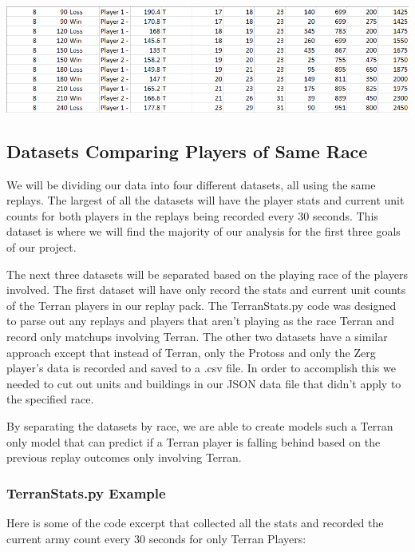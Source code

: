 \documentclass[a4paper,12pt]{report}
\begin{document}
\begin{center}
    \captionsetup{type=figure}
    \includegraphics[width=.9\linewidth]{media/CurrentCSV.png}
\end{center}

\subsection{Datasets Comparing Players of Same Race}

We will be dividing our data into four different datasets, all using the same replays. The largest of all the datasets will have the player stats and current unit counts for both players in the replays being recorded every 30 seconds. This dataset is where we will find the majority of our analysis for the first three goals of our project.

The next three datasets will be separated based on the playing race of the players involved. The first dataset will have only record the stats and current unit counts of the Terran players in our replay pack. The TerranStats.py code was designed to parse out any replays and players that aren’t playing as the race Terran and record only matchups involving Terran. The other two datasets have a similar approach except that instead of Terran, only the Protoss and only the Zerg player’s data is recorded and saved to a .csv file. In order to accomplish this we needed to cut out units and buildings in our JSON data file that didn’t apply to the specified race.

By separating the datasets by race, we are able to create models such a Terran only model that can predict if a Terran player is falling behind based on the previous replay outcomes only involving Terran. 

\subsubsection{TerranStats.py Example}
Here is some of the code excerpt that collected all the stats and recorded the current army count every 30 seconds for only Terran Players:
\end{document}
